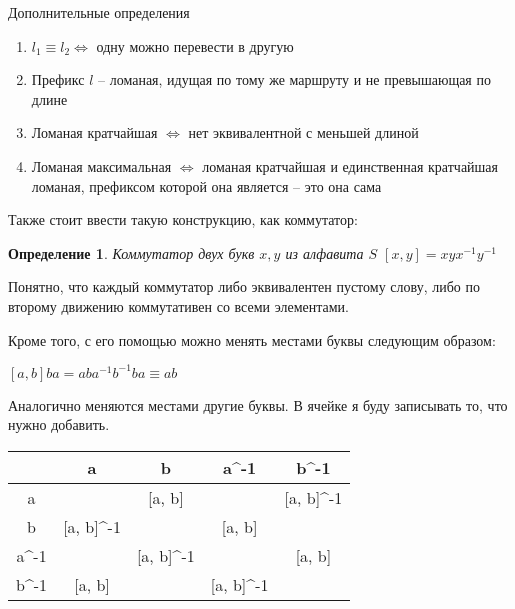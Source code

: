 \documentclass[serif, ucs]{beamer}
\newtheorem{Def}{Определение}[section]
\begin{document}
\begin{frame}{Дополнительные определения}
	\begin{enumerate}
		\item $l_1 \equiv l_2\Longleftrightarrow$ одну можно перевести в другую
		\item Префикс $l$ -- ломаная, идущая по тому же маршруту и не превышающая по длине
		\item Ломаная кратчайшая $\Longleftrightarrow$ нет эквивалентной с меньшей длиной
		\item Ломаная максимальная $\Longleftrightarrow$ ломаная кратчайшая и единственная кратчайшая ломаная, префиксом которой она является -- это она сама
	\end{enumerate}
\end{frame}

\begin{frame}
	\begin{footnotesize}
	Также стоит ввести такую конструкцию, как коммутатор:
	
	\begin{Def}
		Коммутатор двух букв $x, y$ из алфавита $S$  $[x, y] = xyx^{-1}y^{-1}$ 
	\end{Def}
	
	Понятно, что каждый коммутатор либо эквивалентен пустому слову, либо по второму движению коммутативен со всеми элементами.
	
	Кроме того, с его помощью можно менять местами буквы следующим образом:
	
	$[a, b] ba = aba^{-1}b^{-1}ba\equiv ab$
	
	Аналогично меняются местами другие буквы. В ячейке я буду записывать то, что нужно добавить.
	
	\begin{tabular}{C|C|C|C|C|}
		&a&b&a^{-1}&b^{-1}\\
		\hline
		a&\times &[a, b]&\times&[a, b]^{-1}\\
		\hline
		b&[a, b]^{-1}&\times&[a, b]&\times\\
		\hline
		a^{-1}&\times&[a, b]^{-1}&\times&[a, b]\\
		\hline
		b^{-1}&[a, b]&\times&[a, b]^{-1}&\times\\
	\end{tabular}
	\end{footnotesize}
\end{frame}
\end{document}
